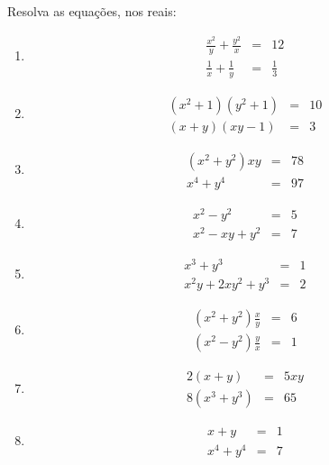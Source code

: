 \begin{questao}
  Resolva as equações, nos reais:

  \begin{enumerate}

  \item
    \begin{eqnarray*}
      \frac{x^2}{y} + \frac{y^2}{x} & = & 12 \\ \frac{1}{x} + \frac{1}{y} & = &
      \frac{1}{3}
    \end{eqnarray*}

  \item
    \begin{eqnarray*}
      (x^2+1)(y^2+1) & = & 10 \\ (x+y)(xy-1) & = & 3
    \end{eqnarray*}

  \item
    \begin{eqnarray*}
      (x^2+y^2)xy & = & 78 \\ x^4+y^4 & = & 97
    \end{eqnarray*}

  \item
    \begin{eqnarray*}
      x^2-y^2 & = & 5 \\ x^2-xy+y^2 & = & 7
    \end{eqnarray*}

  \item
    \begin{eqnarray*}
      x^3+y^3 & = & 1 \\ x^2y+2xy^2+y^3 & = & 2
    \end{eqnarray*}

  \item
    \begin{eqnarray*}
      (x^2+y^2)\frac{x}{y} & = & 6 \\ (x^2-y^2)\frac{y}{x} & = & 1
    \end{eqnarray*}

  \item
    \begin{eqnarray*}
      2(x+y) & = & 5xy \\ 8(x^3+y^3) & = & 65
    \end{eqnarray*}

  \item
    \begin{eqnarray*}
      x+y & = & 1 \\ x^4+y^4 & = & 7
    \end{eqnarray*}


\end{enumerate}
\end{questao}
